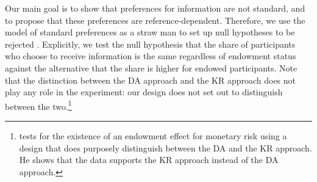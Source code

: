 Our main goal is to show that preferences for information are not standard, and to propose that these preferences are reference-dependent. Therefore, we use the model of standard preferences as a straw man to set up null hypotheses to be rejected \citet{dellavignaChapterStructuralBehavioral2018}. Explicitly, we test the null hypothesis that the share of participants who choose to receive information is the same regardless of endowment status against the alternative that the share is higher for endowed participants. Note that the distinction between the DA approach and the KR approach does not play any role in the experiment: our design does not set out to distinguish between the two.\footnote{\citet{sprengerEndowmentEffectRisk2015} tests for the existence of an endowment effect for monetary risk using a design that does purposely distinguish between the DA and the KR approach. He shows that the data supports the KR approach instead of the DA approach.}
